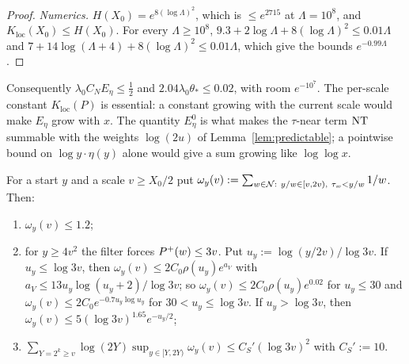 \begin{proof}
\emph{Numerics.} $H(X_0)=e^{8(\log\Lambda)^2}$, which is $\le e^{2715}$ at $\Lambda=10^8$, and $K_{\mathrm{loc}}(X_0)\le H(X_0)$. For
every $\Lambda\ge10^8$, $9.3+2\log\Lambda+8(\log\Lambda)^2\le0.01\Lambda$ and $7+14\log(\Lambda+4)+8(\log\Lambda)^2\le0.01\Lambda$,
which give the bounds $e^{-0.99\Lambda}$.
\end{proof}

Consequently $\lambda_0C_NE_\eta\le\frac12$ and $2.04\lambda_0\theta_*\le0.02$, with room $e^{-10^7}$. The per-scale constant $K_{\mathrm{loc}}(P)$
is essential: a constant growing with the current scale would make $E_\eta$ grow with $x$. The quantity $E_\eta^0$ is what
makes the $\tau$-near term $\mathrm{NT}$ summable with the weights $\log(2u)$ of Lemma~\ref{lem:predictable}; a pointwise bound on
$\log y\cdot\eta(y)$ alone would give a sum growing like $\log\log x$.

\begin{lemma}\label{lem:S}
For a start $y$ and a scale $v\ge X_0/2$ put $\omega_y(v):=\sum_{w\in\NN:\ y/w\in[v,2v),\ \tau_w<y/w}1/w$. Then:
\begin{enumerate}[label=(\roman*)]
\item $\omega_y(v)\le1.2$;
\item for $y\ge4v^2$ the filter forces $P^{+}(w)\le3v$. Put $u_y:=\log(y/2v)/\log3v$. If $u_y\le\log3v$, then
  $\omega_y(v)\le2C_0\rho(u_y)e^{a_V}$ with $a_V\le13u_y\log(u_y+2)/\log3v$; so $\omega_y(v)\le2C_0\rho(u_y)e^{0.02}$ for
  $u_y\le30$ and $\omega_y(v)\le2C_0e^{-0.7u_y\log u_y}$ for $30<u_y\le\log3v$. If $u_y>\log3v$, then
  $\omega_y(v)\le5(\log3v)^{1.65}e^{-u_y/2}$;
\item $\sum_{Y=2^k\ge v}\log(2Y)\sup_{y\in[Y,2Y)}\omega_y(v)\le C_S'(\log3v)^2$ with $C_S':=10$.
\end{enumerate}
\end{lemma}

